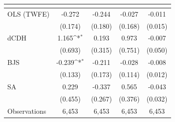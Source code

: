 {
\def\sym#1{\ifmmode^{#1}\else\(^{#1}\)\fi}
\begin{tabular}{l*{4}{c}}
\toprule
            &&&&\\
\midrule
OLS (TWFE) & -0.272 & -0.244 & -0.027 & -0.011 \\
             & (0.174) & (0.180) & (0.168) & (0.015) \\
dCDH & 1.165\sym{*} & 0.193 & 0.973 & -0.007 \\
             & (0.693) & (0.315) & (0.751) & (0.050) \\
BJS & -0.239\sym{*} & -0.211 & -0.028 & -0.008 \\
             & (0.133) & (0.173) & (0.114) & (0.012) \\
SA & 0.229 & -0.337 & 0.565 & -0.043 \\
             & (0.455) & (0.267) & (0.376) & (0.032) \\
\midrule
Observations & 6,453 & 6,453 & 6,453 & 6,453 \\
\bottomrule
\end{tabular}
}
